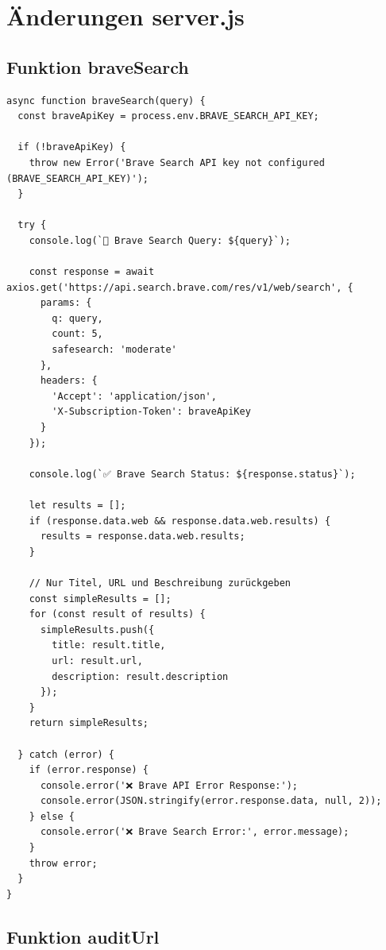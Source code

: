 \chapter{Änderungen server.js}\label{ch:anhang_server}

\section{Funktion braveSearch}

\begin{lstlisting}
async function braveSearch(query) {
  const braveApiKey = process.env.BRAVE_SEARCH_API_KEY;

  if (!braveApiKey) {
    throw new Error('Brave Search API key not configured (BRAVE_SEARCH_API_KEY)');
  }

  try {
    console.log(`🔎 Brave Search Query: ${query}`);

    const response = await axios.get('https://api.search.brave.com/res/v1/web/search', {
      params: {
        q: query,
        count: 5,
        safesearch: 'moderate'
      },
      headers: {
        'Accept': 'application/json',
        'X-Subscription-Token': braveApiKey
      }
    });

    console.log(`✅ Brave Search Status: ${response.status}`);

    let results = [];
    if (response.data.web && response.data.web.results) {
      results = response.data.web.results;
    }

    // Nur Titel, URL und Beschreibung zurückgeben
    const simpleResults = [];
    for (const result of results) {
      simpleResults.push({
        title: result.title,
        url: result.url,
        description: result.description
      });
    }
    return simpleResults;

  } catch (error) {
    if (error.response) {
      console.error('❌ Brave API Error Response:');
      console.error(JSON.stringify(error.response.data, null, 2));
    } else {
      console.error('❌ Brave Search Error:', error.message);
    }
    throw error;
  }
}
\end{lstlisting}

\section{Funktion auditUrl}

